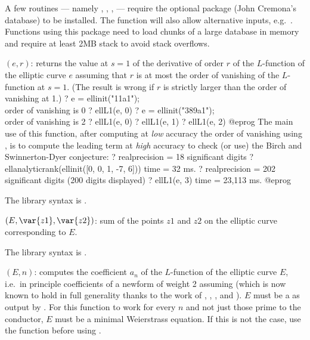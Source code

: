 A few routines --- namely , ,
,  --- require the optional package 
(John Cremona's database) to be installed. The function  will
also allow alternative inputs, e.g.~. Functions using
this package need to load chunks of a large database in memory and require
at least 2MB stack to avoid stack overflows.


$(e, r)$: \label{se:ellL1}returns the value at $s=1$ of the derivative of order $r$ of the
$L$-function of the elliptic curve $e$ assuming that $r$ is at most the order
of vanishing of the $L$-function at $s=1$. (The result is wrong if $r$ is
strictly larger than the order of vanishing at 1.)
\bprog
? e = ellinit("11a1"); \\ order of vanishing is 0
? ellL1(e, 0)
? e = ellinit("389a1");  \\ order of vanishing is 2
? ellL1(e, 0)
? ellL1(e, 1)
? ellL1(e, 2)
@eprog\noindent
The main use of this function, after computing at \emph{low} accuracy the
order of vanishing using , is to compute the
leading term at \emph{high} accuracy to check (or use) the Birch and
Swinnerton-Dyer conjecture:
\bprog
? 
  realprecision = 18 significant digits
? ellanalyticrank(ellinit([0, 0, 1, -7, 6]))
time = 32 ms.
? 
  realprecision = 202 significant digits (200 digits displayed)
? ellL1(e, 3)
time = 23,113 ms.
@eprog

The library syntax is .

$(E,\var{z1},\var{z2})$: \label{se:elladd}
sum of the points $z1$ and $z2$ on the
elliptic curve corresponding to $E$.

The library syntax is .

$(E,n)$: \label{se:ellak}
computes the coefficient $a_n$ of the
$L$-function of the elliptic curve $E$, i.e.~in principle coefficients of a
newform of weight 2 assuming  (which is now
known to hold in full generality thanks to the work of ,
, ,  and ). $E$ must be a
 as output by . For this function
to work for every $n$ and not just those prime to the conductor, $E$ must
be a minimal Weierstrass equation. If this is not the case, use the
function  before using .


